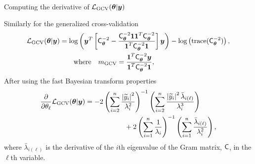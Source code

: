 \documentclass[handout, 10pt,compress,xcolor={usenames,dvipsnames}]{beamer} %
\newcommand{\bm}[1]{\boldsymbol{#1}}
\newcommand{\MLE}{\textup{EB}}
\newcommand{\GCV}{\textup{GCV}}
\renewcommand{\vtheta}{{\bm{\theta}}}
\def\abs#1{\ensuremath{\left \lvert #1 \right \rvert}}
\begin{document}
\begin{frame}{Computing the derivative of $\mathcal{L}_{\GCV}(\vtheta | \vy)$}


Similarly for the generalized cross-validation
	\begin{align*}
	\mathcal{L}_{\GCV}(\vtheta | \vy) &= \log \left(  \vy^T \left[\mC^{-2}_\vtheta - \frac{\mC^{-2}_\vtheta \vone \vone^T \mC^{-2}_\vtheta}{\vone^T \mC^{-2}_\vtheta \vone}  \right] \vy \right)  
	 - \log \left ( \trace(\mC^{-2}_\vtheta) \right ), 
	\\
	& \qquad \text{where} \quad m_{\GCV} = \frac{\vone^T \mC_\vtheta^{-2} \vy}{\vone^T \mC_\vtheta^{-2} \vone},
	\end{align*}
	After using the fast Bayesian transform properties
	\begin{align}
	\nonumber
	\frac{\partial}{\partial \theta_\ell}  \mathcal{L}_\GCV(\vtheta | \vy)
	& = -2 \left ( \sum_{i=2}^n \frac{\abs{\widetilde{y}_i}^2}{\lambda_i^2} \right)^{-1}
	\left ( \sum_{i=2}^n \frac{\abs{\widetilde{y}_i}^2 \bar{\lambda}_{i(\ell)} }{\lambda_i^3}    \right) \\
	\label{eqn:deriv_obj_func_full}	
	& \hspace{2cm}
	+ 2 \left( \sum_{i=1}^n \frac{1}{\lambda_i} \right)^{-1}
	\left( \sum_{i=1}^n \frac{\bar{\lambda}_{i(\ell)} }{\lambda_i^2}  \right),
	\end{align}
where $\bar{\lambda}_{i(\ell)}$ is the derivative of the $i$th eigenvalue of the Gram matrix, $\mathsf{C}$, in the $\ell$th variable.
\end{frame}
\end{document}
